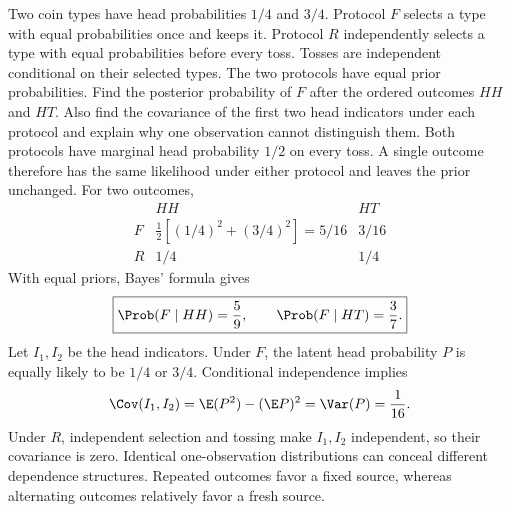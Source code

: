 Two coin types have head probabilities $1/4$ and $3/4$. Protocol $F$ selects a type with equal probabilities once and keeps it. Protocol $R$ independently selects a type with equal probabilities before every toss. Tosses are independent conditional on their selected types. The two protocols have equal prior probabilities. Find the posterior probability of $F$ after the ordered outcomes $HH$ and $HT$. Also find the covariance of the first two head indicators under each protocol and explain why one observation cannot distinguish them.
\solution Both protocols have marginal head probability $1/2$ on every toss. A single outcome therefore has the same likelihood under either protocol and leaves the prior unchanged. For two outcomes,
\[
\begin{array}{c|cc}
&HH&HT\\ \hline
F&\tfrac12[(1/4)^2+(3/4)^2]=5/16&3/16\\
R&1/4&1/4
\end{array}
\]
With equal priors, Bayes' formula gives
\[
\boxed{\Prob(F\mid HH)=\frac59,\qquad
\Prob(F\mid HT)=\frac37.}
\]
Let $I_1,I_2$ be the head indicators. Under $F$, the latent head probability $P$ is equally likely to be $1/4$ or $3/4$. Conditional independence implies
\[
\Cov(I_1,I_2)=\E(P^2)-(\E P)^2=\Var(P)=\frac1{16}.
\]
Under $R$, independent selection and tossing make $I_1,I_2$ independent, so their covariance is zero.
\insight Identical one-observation distributions can conceal different dependence structures. Repeated outcomes favor a fixed source, whereas alternating outcomes relatively favor a fresh source.
